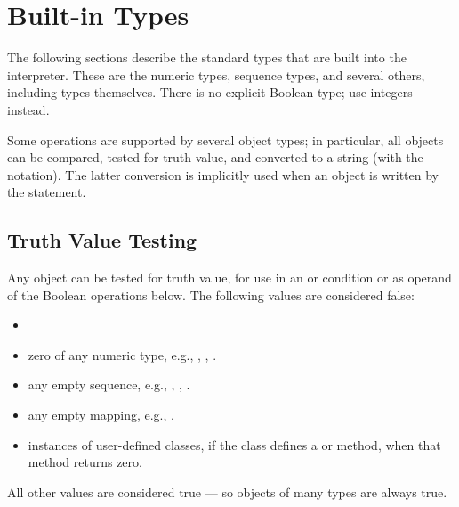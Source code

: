 \section{Built-in Types}

The following sections describe the standard types that are built into
the interpreter.  These are the numeric types, sequence types, and
several others, including types themselves.  There is no explicit
Boolean type; use integers instead.

Some operations are supported by several object types; in particular,
all objects can be compared, tested for truth value, and converted to
a string (with the  notation).  The latter conversion is
implicitly used when an object is written by the  statement.

\subsection{Truth Value Testing}

Any object can be tested for truth value, for use in an  or
 condition or as operand of the Boolean operations below.
The following values are considered false:

\begin{itemize}
\renewcommand{\indexsubitem}{(Built-in object)}

\item	{}

\item	zero of any numeric type, e.g., , , .

\item	any empty sequence, e.g., , \code{()}, \code{[]}.

\item	any empty mapping, e.g., \code{\{\}}.

\item	instances of user-defined classes, if the class defines a
	 or  method, when that
	method returns zero.

\end{itemize}

All other values are considered true --- so objects of many types are
always true.

